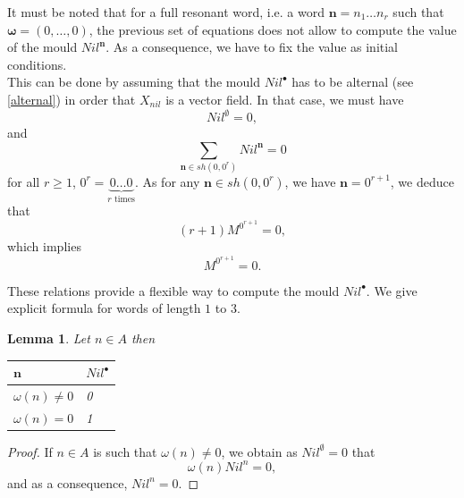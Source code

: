 \documentclass[english,11pt]{amsart}
\newtheorem{lemma}{Lemma}
\def\nn{\mathbf{n}}
\def\di{\displaystyle}
\def\nn{\mathbf{n}}
\def\oo{\boldsymbol\omega}
\begin{document}
It must be noted that for a full resonant word, i.e. a word $\nn =n_1 \dots n_r$ such that $\oo =(0,\dots ,0)$, the previous set of equations does not allow to compute the value of the mould $Nil^{\nn}$. As a consequence, we have to fix the value as initial conditions. \\

This can be done by assuming that the mould $Nil^{\bullet}$ has to be alternal (see \eqref{alternal}) in order that $X_{nil}$ is a vector field. In that case, we must have
\begin{equation}
Nil^{\emptyset} =0 ,
\end{equation}
and
\begin{equation}
    \di\sum_{\nn \in sh (0, 0^r )} Nil^{\nn} =0
\end{equation}
for all $r\geq 1$, $0^r = \underset{r \text{ times}}{\underbrace{0\dots 0}}$. As for any $\nn \in sh (0,0^r )$, we have $\nn=0^{r+1}$, we deduce that
\begin{equation}
    (r+1) M^{0^{r+1}} =0 ,
\end{equation}
which implies 
\begin{equation}
    M^{0^{r+1}} =0 .
\end{equation}

These relations provide a flexible way to compute the mould $Nil^{\bullet}$. We give explicit formula for words of length $1$ to $3$.

\begin{lemma}
Let $n\in A$ then 
\begin{center}
\begin{tabular}{|R{2cm} | L{1.5cm} |}
 \hline   $\nn$ & $Nil^{\bullet}$ \\
 \hline   $\omega (n) \not= 0$ & 0 \\
\hline   $\omega (n)=0$ & 1\\
\hline
\end{tabular}
\end{center}
\end{lemma}

\begin{proof}
If $n\in A$ is such that $\omega (n)\not =0$, we obtain as $Nil^{\emptyset} =0$ that 
\begin{equation}
    \omega (n) Nil^{n} =0 ,
\end{equation}
and as a consequence, $Nil^n =0$. 
\end{proof}
\end{document}
